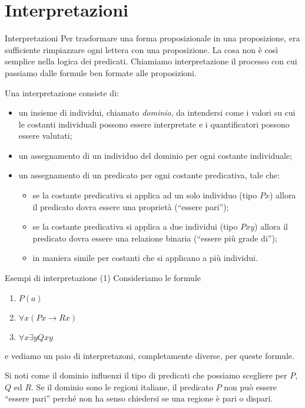 \documentclass[aspectratio=169,10pt,dvipsnames,xcolor=table]{beamer}
\begin{document}
\section{Interpretazioni}

\begin{frame}{Interpretazioni}
    Per trasformare una forma proposizionale in una proposizione, era sufficiente rimpiazzare ogni lettera con una proposizione. La cosa non è così semplice nella logica dei predicati. Chiamiamo \alert{interpretazione} il processo con cui passiamo dalle formule ben formate alle proposizioni.

    \begin{definition}
        Una \alert{interpretazione} consiste di:
        \begin{itemize}
            \item un insieme di individui, chiamato \emph{dominio}, da intendersi come i valori su cui le costanti individuali possono essere interpretate e i quantificatori possono essere valutati;
            \item un assegnamento di un individuo del dominio per ogni costante individuale;
            \item un assegnamento di un predicato per ogni costante predicativa, tale che:
                  \begin{itemize}
                      \item se la costante predicativa si applica ad un solo individuo (tipo $Px$) allora il predicato dovra essere una proprietà (``essere pari'');
                      \item se la costante predicativa si applica a due individui (tipo $Pxy$) allora il predicato dovra essere una relazione binaria (``essere più grade di'');
                      \item in maniera simile per costanti che si applicano a più individui.
                  \end{itemize}
        \end{itemize}
    \end{definition}
\end{frame}

\begin{frame}{Esempi di interpretazione (1)}
    Consideriamo le formule
    \begin{enumerate}
        \item $P(a)$
        \item $\forall x (P x \to R x)$
        \item $\forall x \exists y Qxy$
    \end{enumerate}
    e vediamo un paio di interpretazoni, completamente diverse, per queste formule.

    \medskip
    Si noti come il dominio influenzi il tipo di predicati che possiamo scegliere per $P$, $Q$ ed $R$. Se il dominio sono le regioni italiane, il predicato $P$ non può essere ``essere pari'' perché non ha senso chiedersi se una regione è pari o dispari.
\end{frame}
\end{document}
